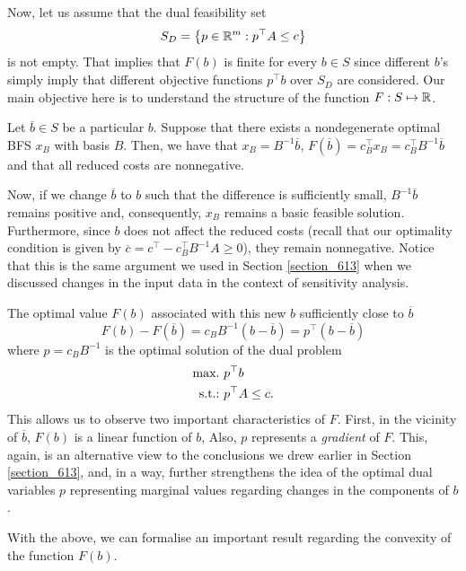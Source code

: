 Now, let us assume that the dual feasibility set 
%
\begin{equation*}
	S_D = \left\{ p \in \mathbb{R}^m : p^\top A \le c \right \}	
\end{equation*}
% 
is not empty. That implies that $F(b)$ is finite for every $b \in S$ since different $b$'s simply imply that different objective functions $p^\top b$ over $S_D$ are considered. Our main objective here is to understand the structure of the function $F: S \mapsto \mathbb{R}$. 

Let $\overline{b} \in S$ be a particular $b$. Suppose that there exists a nondegenerate optimal BFS $x_B$ with basis $B$. Then, we have that $x_B = B^{-1}\overline{b}$, $F(\overline{b}) = c_B^\top x_B =  c_B^\top B^{-1}\overline{b}$ and that all reduced costs are nonnegative. 

Now, if we change $\overline{b}$ to $b$ such that the difference is sufficiently small, $B^{-1}\overline{b}$ remains positive and, consequently, $x_B$ remains a basic feasible solution. Furthermore, since $b$ does not affect the reduced costs (recall that our optimality condition is given by $\overline{c} = c^\top - c_B ^\top B^{-1}A \ge 0$), they remain nonnegative. Notice that this is the same argument we used in Section \ref{section_613} when we discussed changes in the input data in the context of sensitivity analysis.

The optimal value $F(b)$ associated with this new $b$ sufficiently close to $\overline{b}$   
%
\begin{equation*}
	F(b) - F(\overline{b})= c_B B^{-1}(b - \overline{b}) = p^\top (b - \overline{b}) 
\end{equation*}
%
where $p = c_B B^{-1}$ is the optimal solution of the dual problem 
%
\begin{align*}
	\mathop{\text{max.~}} & p^\top b \\
	\mathop{\text{s.t.:~}}   & p^\top A \le c.
\end{align*}
%
This allows us to observe two important characteristics of $F$. First, in the vicinity of $\overline{b}$, $F(b)$ is a linear function of $b$, Also, $p$ represents a \emph{gradient} of $F$. This, again, is an alternative view to the conclusions we drew earlier in Section \ref{section_613}, and, in a way, further strengthens the idea of the optimal dual variables $p$ representing marginal values regarding changes in the components of $b$.

With the above, we can formalise an important result regarding the convexity of the function $F(b)$.

